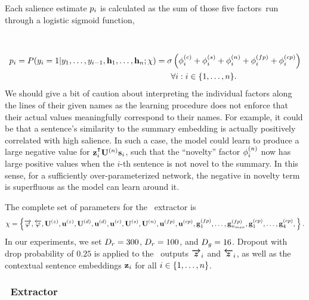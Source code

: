 Each salience estimate $p_i$ is calculated as the sum of those five
factors~run through a logistic sigmoid function,\\~\\

\\[-40pt]
\begin{align}
  p_i =  P(y_i=1|y_1,\dots,y_{i-1},\mathbf{h}_1,\ldots,\mathbf{h}_n;\chi)
         & = 
        \sigma\left(\phi^{(c)}_i 
        + \phi^{(s)}_i + \phi^{(n)}_i
    + \phi^{(fp)}_i + \phi^{(cp)}_i   \right) \nonumber \\
    & \phantom{= } \quad \forall i : i \in \{1,\ldots,n\}.
\end{align}
We should give a bit of caution about interpreting the individual factors along
the lines of their given names as the learning procedure does not enforce that
their actual values meaningfully correspond to their names. For example, it
could be that a sentence's similarity to the summary embedding is actually
positively correlated with high salience. In such a case, the model could learn
to produce a large negative value for $\srHid_i^\T \srNoveltyWeight \srSum_i$,
such that the ``novelty'' factor $\phi^{(n)}_i$ now has large positive
values when the $i$-th sentence is not novel to the summary. In this sense, for
a sufficiently over-parameterized network, the negative in novelty term is
superfluous as the model can learn around it. 

The complete set of parameters for the \srext~extractor is 
\[
    \chi = \left\{\overrightarrow{\varphi},\overleftarrow{\varphi},\mathbf{U}^{(z)},\mathbf{u}^{(z)},
\mathbf{U}^{(d)},\mathbf{u}^{(d)}, \mathbf{u}^{(c)}, \mathbf{U}^{(s)}, \mathbf{U}^{(n)},
\mathbf{u}^{(fp)}, \mathbf{u}^{(cp)}, \mathbf{g}^{(fp)}_1,\ldots,\mathbf{g}^{(fp)}_{{n_{max}}}, \mathbf{g}^{(cp)}_1,\ldots,\mathbf{g}^{(cp)}_4,\right\}. 
\]
In our experiments, we set ${D_r}=300$, ${D_r}=100$, and
${D_g}=16$. Dropout with drop probability of $0.25$ is applied to the
\gru~outputs $\boldsymbol{\overrightarrow{z}}_i$ and $\boldsymbol{\overleftarrow{z}}_i$, as well as the contextual sentence
embeddings $\mathbf{z}_i$ for all $i \in \{1,\ldots,n\}$.

\subsubsection{\rnnext~Extractor}

